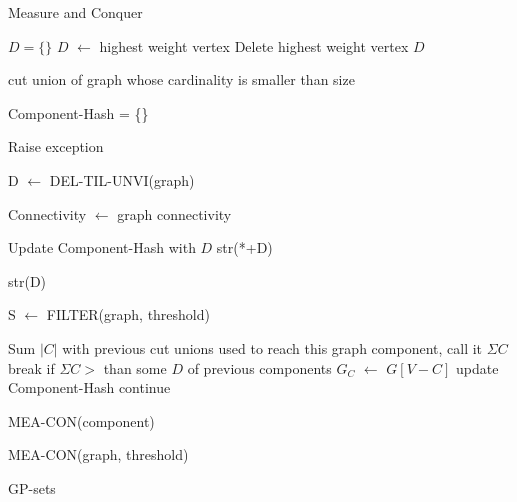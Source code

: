 \documentclass[a4paper]{article}
\begin{document}
\begin{algorithm}
\caption{Measure and Conquer}\label{euclid}
\begin{algorithmic}

\State $D = \{\}$   
      	\State $D$ $\gets$ highest weight vertex
        \State Delete highest weight vertex 
      \EndWhile\label{euclidendwhile}
\Return $D$ 
%
\EndFunction

 cut union of graph whose cardinality is smaller than size
\EndFunction 

\State Component-Hash = \{\}


\State Raise exception 
\EndIf

\State D $\gets$ DEL-TIL-UNVI(graph) 

\State Connectivity $\gets$ graph connectivity

 
	\State Update Component-Hash with $D$
	\State 
	\Return str(*+D)
\EndIf


\Return str(D)



\EndFunction

\State S $\gets$ FILTER(graph, threshold)



	\State Sum $|C|$ with previous cut unions used to reach this graph component, call it $\Sigma C$
	\State break if $\Sigma C >$ than some $D$ of previous components 
	\State 
	\State $G_C$ $\gets$ $G[V-C]$
	\State update Component-Hash
	\State continue
	\EndIf
	
	\State MEA-CON(component) 
	\EndFor
\EndFor

\EndIf


\State MEA-CON(graph, threshold)

\EndFunction



\Return GP-sets

\EndFunction
\end{algorithmic}
\end{algorithm}
\end{document}
